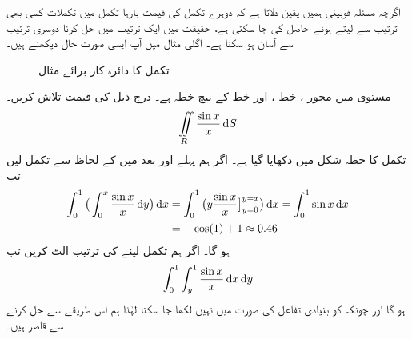 اگرچہ مسئلہ فوبینی ہمیں یقین  دلاتا  ہے کہ دوہرے  تکمل کی قیمت    بارہا تکمل میں      تکملات کسی بھی ترتیب سے  لیتے ہوئے حاصل کی جا سکتی ہے، حقیقت میں ایک ترتیب  میں حل کرنا   دوسری ترتیب  سے آسان ہو سکتا ہے۔ اگلی مثال میں آپ ایسی صورت حال دیکھتے ہیں۔

\begin{figure}
\centering
{}
\caption
{تکمل کا دائرہ کار برائے مثال }
\label{شکل_مثال_بالکثرت_غیر_بنیادی_تفاعل}
\end{figure}
مستوی  میں محور ، خط ،  اور خط  کے بیچ خطہ  ہے۔ درج ذیل کی قیمت تلاش کریں۔
\begin{align*}
\iint\limits_R \frac{\sin x}{x}\dif S
\end{align*}
تکمل کا خطہ شکل   میں دکھایا گیا ہے۔ اگر ہم پہلے  اور بعد میں  کے لحاظ سے تکمل لیں تب
\begin{align*}
\int_0^1\big(\int_0^x \frac{\sin x}{x}\dif y\big)\dif x&=\int_0^1\big(y\frac{\sin x}{x}\big]_{y=0}^{y=x}\big)\dif x=
\int_0^1\sin x\dif x\\
&=-\cos(1)+1\approx 0.46
\end{align*}
ہو گا۔ اگر ہم تکمل لینے کی ترتیب الٹ کریں تب 
\begin{align*}
\int_0^1\int_y^1\frac{\sin x}{x}\dif x\dif y
\end{align*}
ہو گا اور چونکہ  کو  بنیادی تفاعل کی صورت میں نہیں لکھا جا سکتا  لہٰذا  ہم اس طریقے سے   حل کرنے سے قاصر ہیں۔

